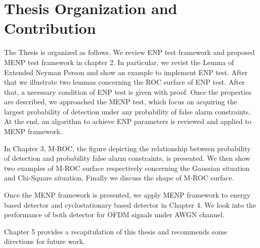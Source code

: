 \section{Thesis Organization and Contribution}
The Thesis is organized as follows. We review ENP test framework and proposed MENP test framework in chapter 2. In particular, we revist the Lemma of Extended Neyman Person and show an example to implement ENP test. After that we illustrate two lemmas concerning the ROC surface of ENP test. After that, a necessary condition of ENP test is given with proof. Once the properties are described, we approached the MENP test, which focus on acquiring the largest probability of detection under any probability of false alarm constraints. At the end, an algorithm to achieve ENP parameters is reviewed and applied to MENP framework.

In Chapter 3, M-ROC, the figure depicting the relationship between probability of detection and probability false alarm constraints, is presented.  We then show two examples of M-ROC surface respectively concerning the Gaussian situation and Chi-Square situation. Finally we discuss the shape of M-ROC surface.

Once the MENP framework is presented, we apply MENP framework to energy based detector and cyclostationary based detector in Chapter 4. We look into the performance of both detector for OFDM signals under AWGN channel. 

Chapter 5 provides a recapitulation of this thesis and recommends some directions for future work.  
